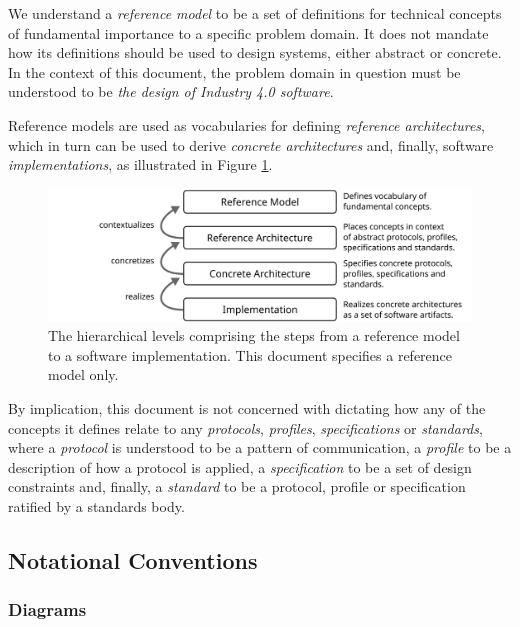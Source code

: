 We understand a \textit{reference model} to be a set of definitions for technical concepts of fundamental importance to a specific problem domain.
It does not mandate how its definitions should be used to design systems, either abstract or concrete.
In the context of this document, the problem domain in question must be understood to be \textit{the design of Industry 4.0 software}.

Reference models are used as vocabularies for defining \textit{reference architectures}, which in turn can be used to derive \textit{concrete architectures} and, finally, software \textit{implementations}, as illustrated in Figure \ref{fig:model-implementation-hierarchy}.

\begin{figure}[ht]
  \centering
  \includegraphics{figures/model-implementation-hierarchy}
  \caption{
    The hierarchical levels comprising the steps from a reference model to a software implementation.
    This document specifies a reference model only.
  }
  \label{fig:model-implementation-hierarchy}
\end{figure}

By implication, this document is not concerned with dictating how any of the concepts it defines relate to any \textit{protocols}, \textit{profiles}, \textit{specifications} or \textit{standards}, where a \textit{protocol} is understood to be a pattern of communication, a \textit{profile} to be a description of how a protocol is applied, a \textit{specification} to be a set of design constraints and, finally, a \textit{standard} to be a protocol, profile or specification ratified by a standards body.

\newpage

\subsection{Notational Conventions}
\label{sec:introduction:conventions}

\subsubsection{Diagrams}

